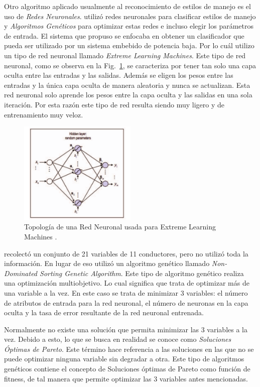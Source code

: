 Otro algoritmo aplicado usualmente al reconocimiento de estilos de manejo es el uso de {\it Redes Neuronales}. \citeauthor{7727682} \cite{7727682} utilizó redes neuronales para clasificar estilos de manejo y {\it Algoritmos Genéticos} para optimizar estas redes e incluso elegir los parámetros de entrada. El sistema que propuso se enfocaba en obtener un clasificador que pueda ser utilizado por un sistema embebido de potencia baja. Por lo cuál utilizo un tipo de red neuronal llamado {\it Extreme Learning Machines}. Este tipo de red neuronal, como se observa en la Fig.~\ref{fig:2.6}, se caracteriza por tener tan solo una capa oculta entre las entradas y las salidas. Además se eligen los pesos entre las entradas y la única capa oculta de manera aleatoria y nunca se actualizan. Esta red neuronal solo aprende los pesos entre la capa oculta y las salidas en una sola iteración. Por esta razón este tipo de red resulta siendo muy ligero y de entrenamiento muy veloz.

\begin{figure}[htb!]
\centering
\includegraphics[width=0.5\textwidth]{Fig6}
\caption[Topología de una Red Neuronal usada para Extreme Learning Machines]{Topología de una Red Neuronal usada para Extreme Learning Machines \cite{7727682}.}
\label{fig:2.6}
\end{figure}

\citeauthor{7727682} recolectó un conjunto de 21 variables de 11 conductores, pero no utilizó toda la información. En lugar de eso utilizó un algoritmo genético llamado {\it Non-Dominated Sorting Genetic Algorithm}. Este tipo de algoritmo genético realiza una optimización multiobjetivo. Lo cual significa que trata de optimizar más de una variable a la vez. En este caso se trata de minimizar 3 variables: el número de atributos de entrada para la red neuronal, el número de neuronas en la capa oculta y la tasa de error resultante de la red neuronal entrenada.

Normalmente no existe una solución que permita minimizar las 3 variables a la vez. Debido a esto, lo que se busca en realidad se conoce como {\it Soluciones Óptimas de Pareto}. Este término hace referencia a las soluciones en las que no se puede optimizar ninguna variable sin degradar a otra. Este tipo de algoritmos genéticos contiene el concepto de Soluciones óptimas de Pareto como función de fitness, de tal manera que permite optimizar las 3 variables antes mencionadas.

